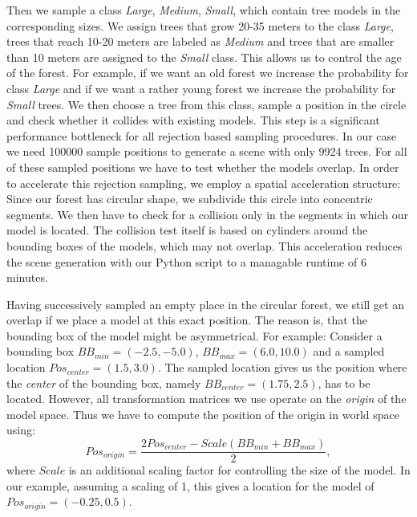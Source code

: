 Then we sample a class \textit{Large}, \textit{Medium}, \textit{Small}, which contain tree models in the corresponding sizes.
We assign trees that grow 20-35 meters to the class \textit{Large}, trees that reach 10-20 meters are labeled as \textit{Medium} and trees that are smaller than 10 meters are assigned to the \textit{Small} class.
This allows us to control the age of the forest.
For example, if we want an old forest we increase the probability for class \textit{Large} and if we want a rather young forest we increase the probability for \textit{Small} trees.
We then choose a tree from this class, sample a position in the circle and check whether it collides with existing models.
This step is a significant performance bottleneck for all rejection based sampling procedures.
In our case we need 100000 sample positions to generate a scene with only 9924 trees.
For all of these sampled positions we have to test whether the models overlap.
In order to accelerate this rejection sampling, we employ a spatial acceleration structure: Since our forest has circular shape, we subdivide this circle into concentric segments.
We then have to check for a collision only in the segments in which our model is located.
The collision test itself is based on cylinders around the bounding boxes of the models, which may not overlap.
This acceleration reduces the scene generation with our Python script to a managable runtime of 6 minutes.

Having successively sampled an empty place in the circular forest, we still get an overlap if we place a model at this exact position.
The reason is, that the bounding box of the model might be asymmetrical.
For example: Consider a bounding box $BB_{min}=(-2.5, -5.0)$, $BB_{max}=(6.0, 10.0)$ and a sampled location $Pos_{center}=(1.5, 3.0)$.
The sampled location gives us the position where the \textit{center} of the bounding box, namely $BB_{center}=(1.75, 2.5)$, has to be located.
However, all transformation matrices we use operate on the \textit{origin} of the model space.
Thus we have to compute the position of the origin in world space using:
\begin{equation*}
    Pos_{origin}=\frac{2Pos_{center}-Scale(BB_{min}+BB_{max})}{2},
\end{equation*}
where $Scale$ is an additional scaling factor for controlling the size of the model.
In our example, assuming a scaling of 1, this gives a location for the model of $Pos_{origin}=(-0.25, 0.5)$.


